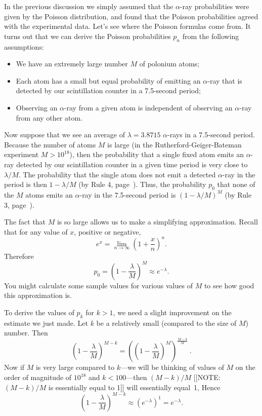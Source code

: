 In the previous discussion we simply assumed that the $\alpha$-ray
probabilities were given by the Poisson distribution, and found that
the Poisson probabilities agreed with the experimental data. Let's see
where the Poisson formulas come from.  It turns out that we can derive
the Poisson probabilities $p_n$ from the following assumptions:
\begin{itemize}

\item We have an extremely large number $M$ of polonium atoms;

\item Each atom has a small but equal probability of emitting an
  $\alpha$-ray that is detected by our scintillation counter in a
  7.5-second period;

\item Observing an $\alpha$-ray from a given atom is independent of
  observing an $\alpha$-ray from any other atom.
\end{itemize}

Now suppose that we see an average of $\lambda = 3.8715$ $\alpha$-rays
in a 7.5-second period.  Because the number of atoms $M$ is large (in
the Rutherford-Geiger-Bateman experiment $M > 10^{18}$), then the
probability that a single fixed atom emits an $\alpha$-ray detected by
our scintillation counter in a given time period is very close to
$\lambda/M$.  The probability that the single atom does not emit a
detected $\alpha$-ray in the period is then $1-\lambda/M$ (by Rule 4,
page~\pageref{rule4}). Thus, the probability $p_0$ that none of the
$M$ atoms emits an $\alpha$-ray in the 7.5-second period is
$(1-\lambda/M)^M$ (by Rule 3, page~\pageref{rule3}).

The fact that $M$ is so large allows us to make a simplifying
approximation.  Recall that for any value of $x$, positive or
negative,
\[
e^x = \lim_{n\rightarrow\infty}\left(1+\dfrac{x}{n}\right)^n.
\]
Therefore  
\[
p_0 = \left(1-\dfrac{\lambda}{M}\right)^M \approx 
	e^{-\lambda}.
\] 
You might calculate some sample values for various values of $M$ to
see how good this approximation is.

To derive the values of $p_k$ for $k>1$, we need a slight improvement
on the estimate we just made.  Let $k$ be a relatively small (compared
to the size of $M$) number. Then
\[
\left( 1-\dfrac{\lambda}{M}\right)^{M-k}
  = \left(\left( 1- \dfrac{\lambda}{M}\right)^M\right)^{\frac{M-k}{M}}\ .
\]
Now if $M$ is very large compared to $k$---we will be thinking of
values of $M$ on the order of magnitude of $10^{18}$ and
$k<100$---then $(M-k)/M$ 
[[NOTE:$(M-k)/M$ is essentially equal to 1]]
will essentially equal~1, Hence
\[
\left( 1-\dfrac{\lambda}{M}\right)^{M-k}
   \approx \left(e^{-\lambda}\right)^1=e^{-\lambda}.
\]

